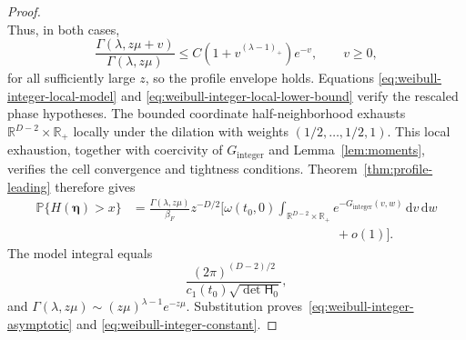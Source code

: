 \documentclass[11pt]{amsart}
\numberwithin{equation}{section}
\theoremstyle{definition}
\theoremstyle{remark}
\newcommand{\R}{\mathbb{R}}
\newcommand{\dd}{\,\mathrm{d}}
\begin{document}
\begin{proof}
\[\]
Thus, in both cases,
\begin{equation}\label{eq:weibull-shifted-profile-envelope}
 \frac{\Gamma(\lambda,z\mu+v)}{\Gamma(\lambda,z\mu)}
 \le C(1+v^{(\lambda-1)_+})e^{-v},
 \qquad v\ge0,
\end{equation}
for all sufficiently large $z$, so the profile envelope holds.  Equations
\eqref{eq:weibull-integer-local-model} and
\eqref{eq:weibull-integer-local-lower-bound} verify the rescaled phase
hypotheses.  The bounded coordinate half-neighborhood exhausts
$\R^{D-2}\times\R_+$ locally under the dilation with weights
$(1/2,\ldots,1/2,1)$.  This local exhaustion, together with coercivity of
$G_{\mathrm{integer}}$ and Lemma~\ref{lem:moments}, verifies the cell
convergence and tightness conditions.  Theorem~\ref{thm:profile-leading}
therefore gives
\begin{equation}\label{eq:weibull-integer-profile-application}
 \begin{aligned}
 \mathbb P\{H(\bm\eta)>x\}
 &=\frac{\Gamma(\lambda,z\mu)}{\beta_F} z^{-D/2}\Bigg[
 \omega(t_0,0)\int_{\R^{D-2}\times\R_+}e^{-G_{\mathrm{integer}}(v,w)}\dd v\dd w\\
 &\hspace{16em}{}+o(1)\Bigg].
 \end{aligned}
\end{equation}
The model integral equals
\[
 \frac{(2\pi)^{(D-2)/2}}
 {c_1(t_0)\sqrt{\det\mathsf H_0}},
\]
and
$\Gamma(\lambda,z\mu)\sim(z\mu)^{\lambda-1}e^{-z\mu}$.
Substitution proves~\eqref{eq:weibull-integer-asymptotic} and
\eqref{eq:weibull-integer-constant}.
\end{proof}
\end{document}

